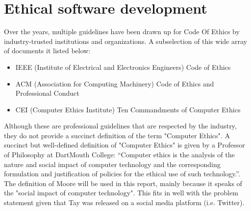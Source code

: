 \section{Ethical software development}
Over the years, multiple guidelines have been drawn up for Code Of Ethics by industry-trusted institutions and organizations. A subselection of this wide array of documents it listed below:
\begin{itemize}
	\item IEEE (Institute of Electrical and Electronics Engineers) Code of Ethics\cite{IEEE}
	\item ACM (Association for Computing Machinery) Code of Ethics and Professional Conduct\cite{ACM}
	\item CEI (Computer Ethics Institute) Ten Commandments of Computer Ethics\cite{CEI}
\end{itemize}
Although these are professional guidelines that are respected by the industry, they do not provide a succinct definition of the term "Computer Ethics". A succinct but well-defined definition of "Computer Ethics" is given by a Professor of Philosophy at DartMouth College: “Computer ethics is the analysis of the nature and social impact of computer technology and the corresponding formulation and justification of policies for the ethical use of such technology.”\cite{Moor}.
The definition of Moore will be used in this report, mainly because it speaks of the "social impact of computer technology". This fits in well with the problem statement given that Tay was released on a social media platform (i.e. Twitter).
